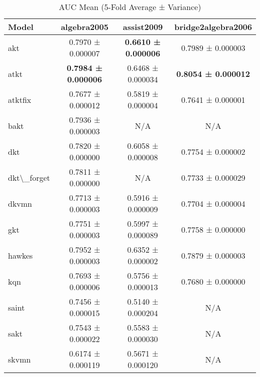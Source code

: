 \begin{table}[H]
\centering
\caption{AUC Mean (5-Fold Average ± Variance)}
\label{tab:auc_mean}
\begin{tabular}{lccc}
\toprule
Model & algebra2005 & assist2009 & bridge2algebra2006 \\
\midrule
akt & 0.7970 ± 0.000007 & \textbf{0.6610 ± 0.000006} & 0.7989 ± 0.000003 \\
atkt & \textbf{0.7984 ± 0.000006} & 0.6468 ± 0.000034 & \textbf{0.8054 ± 0.000012} \\
atktfix & 0.7677 ± 0.000012 & 0.5819 ± 0.000004 & 0.7641 ± 0.000001 \\
bakt & 0.7936 ± 0.000003 & N/A & N/A \\
dkt & 0.7820 ± 0.000000 & 0.6058 ± 0.000008 & 0.7754 ± 0.000002 \\
dkt\textbackslash{}_forget & 0.7811 ± 0.000000 & N/A & 0.7733 ± 0.000029 \\
dkvmn & 0.7713 ± 0.000003 & 0.5916 ± 0.000009 & 0.7704 ± 0.000004 \\
gkt & 0.7751 ± 0.000003 & 0.5997 ± 0.000089 & 0.7758 ± 0.000000 \\
hawkes & 0.7952 ± 0.000003 & 0.6352 ± 0.000002 & 0.7879 ± 0.000003 \\
kqn & 0.7693 ± 0.000006 & 0.5756 ± 0.000013 & 0.7680 ± 0.000000 \\
saint & 0.7456 ± 0.000015 & 0.5140 ± 0.000204 & N/A \\
sakt & 0.7543 ± 0.000022 & 0.5583 ± 0.000030 & N/A \\
skvmn & 0.6174 ± 0.000119 & 0.5671 ± 0.000120 & N/A \\
\bottomrule
\end{tabular}
\end{table}